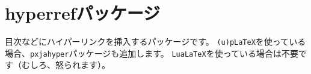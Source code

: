 \section{hyperrefパッケージ}

目次などにハイパーリンクを挿入するパッケージです。
\texttt{(u)pLaTeX}を使っている場合、\texttt{pxjahyper}パッケージも追加します。
\texttt{LuaLaTeX}を使っている場合は不要です（むしろ、怒られます）。
